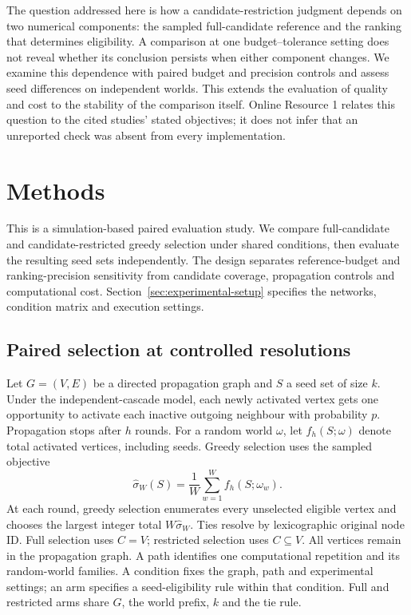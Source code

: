 \documentclass[smallextended]{svjour3}
\begin{document}
The question addressed here is how a candidate-restriction judgment depends on two numerical components: the sampled full-candidate reference and the ranking that determines eligibility. A comparison at one budget--tolerance setting does not reveal whether its conclusion persists when either component changes. We examine this dependence with paired budget and precision controls and assess seed differences on independent worlds. This extends the evaluation of quality and cost to the stability of the comparison itself. Online Resource 1 relates this question to the cited studies' stated objectives; it does not infer that an unreported check was absent from every implementation.

\section{Methods}
This is a simulation-based paired evaluation study. We compare full-candidate and candidate-restricted greedy selection under shared conditions, then evaluate the resulting seed sets independently. The design separates reference-budget and ranking-precision sensitivity from candidate coverage, propagation controls and computational cost. Section~\ref{sec:experimental-setup} specifies the networks, condition matrix and execution settings.
\subsection{Paired selection at controlled resolutions}
Let $G=(V,E)$ be a directed propagation graph and $S$ a seed set of size $k$. Under the independent-cascade model, each newly activated vertex gets one opportunity to activate each inactive outgoing neighbour with probability $p$. Propagation stops after $h$ rounds. For a random world $\omega$, let $f_h(S;\omega)$ denote total activated vertices, including seeds. Greedy selection uses the sampled objective
\begin{equation}
\widehat\sigma_W(S)=\frac{1}{W}\sum_{w=1}^{W}f_h(S;\omega_w).
\end{equation}
At each round, greedy selection enumerates every unselected eligible vertex and chooses the largest integer total $W\widehat\sigma_W$. Ties resolve by lexicographic original node ID. Full selection uses $C=V$; restricted selection uses $C\subseteq V$. All vertices remain in the propagation graph. A path identifies one computational repetition and its random-world families. A condition fixes the graph, path and experimental settings; an arm specifies a seed-eligibility rule within that condition. Full and restricted arms share $G$, the world prefix, $k$ and the tie rule.
\end{document}

